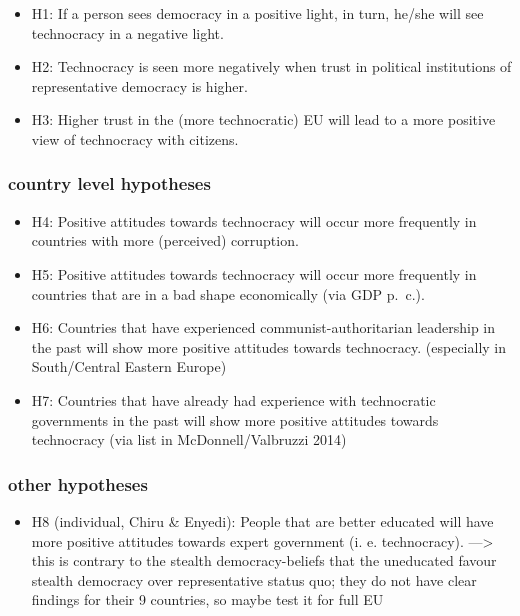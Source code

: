 \documentclass[
  12pt,
  english,
]{article}
\providecommand{\tightlist}{%
  \setlength{\itemsep}{0pt}\setlength{\parskip}{0pt}}
\begin{document}
\begin{itemize}
\tightlist
\item
  H1: If a person sees democracy in a positive light, in turn, he/she
  will see technocracy in a negative light.
\item
  H2: Technocracy is seen more negatively when trust in political
  institutions of representative democracy is higher.
\item
  H3: Higher trust in the (more technocratic) EU will lead to a more
  positive view of technocracy with citizens.
\end{itemize}

\hypertarget{country-level-hypotheses}{%
\subsubsection{country level
hypotheses}\label{country-level-hypotheses}}

\begin{itemize}
\tightlist
\item
  H4: Positive attitudes towards technocracy will occur more frequently
  in countries with more (perceived) corruption.
\item
  H5: Positive attitudes towards technocracy will occur more frequently
  in countries that are in a bad shape economically (via GDP p.~c.).
\item
  H6: Countries that have experienced communist-authoritarian leadership
  in the past will show more positive attitudes towards technocracy.
  (especially in South/Central Eastern Europe)
\item
  H7: Countries that have already had experience with technocratic
  governments in the past will show more positive attitudes towards
  technocracy (via list in McDonnell/Valbruzzi 2014)
\end{itemize}

\hypertarget{other-hypotheses}{%
\subsubsection{other hypotheses}\label{other-hypotheses}}

\begin{itemize}
\tightlist
\item
  H8 (individual, Chiru \& Enyedi): People that are better educated will
  have more positive attitudes towards expert government (i. e.
  technocracy). ---\textgreater{} this is contrary to the stealth
  democracy-beliefs that the uneducated favour stealth democracy over
  representative status quo; they do not have clear findings for their 9
  countries, so maybe test it for full EU
\end{itemize}
\end{document}
